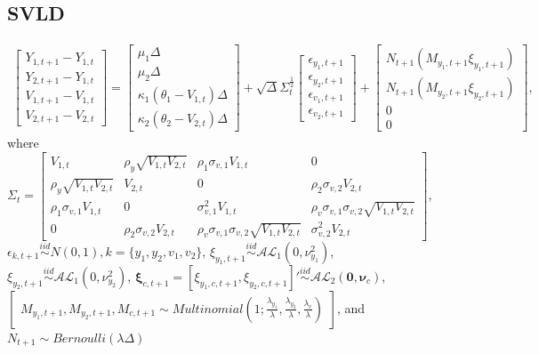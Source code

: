 \documentclass{article}\usepackage[]{graphicx}\usepackage[]{color}
\begin{document}
\subsection{SVLD}

\begin{align}
    \begin{bmatrix} Y_{1,t + 1} - Y_{1,t} \\ Y_{2,t + 1} - Y_{1,t} \\ V_{1,t + 1} - V_{1,t} \\ V_{2,t + 1} - V_{2,t} \end{bmatrix} = \begin{bmatrix} \mu_1 \Delta \\ \mu_2 \Delta \\ \kappa_1(\theta_1 - V_{1,t}) \Delta \\ \kappa_2(\theta_2 - V_{2,t}) \Delta \end{bmatrix} + \sqrt{\Delta}\Sigma_t^{\frac{1}{2}} \begin{bmatrix} \epsilon_{y_1,t+1} \\ \epsilon_{y_2,t+1} \\ \epsilon_{v_1,t+1} \\ \epsilon_{v_2,t+1} \end{bmatrix} + \begin{bmatrix} N_{t+1}(M_{y_1,t+1} \xi_{y_1, t+1} ) \\ N_{t+1}(M_{y_2,t+1} \xi_{y_2, t+1} ) \\ 0 \\ 0 \end{bmatrix}, \label{S_tdisc_2d}
\end{align}
where $\Sigma_{t} = \begin{bmatrix} V_{1,t} & \rho_y \sqrt{V_{1,t}V_{2,t}} & \rho_1 \sigma_{v,1} V_{1,t} & 0 \\ \rho_y \sqrt{V_{1,t}V_{2,t}} & V_{2,t} & 0 & \rho_2 \sigma_{v,2} V_{2,t} \\ \rho_1 \sigma_{v,1} V_{1,t} & 0 & \sigma_{v,1}^2 V_{1,t} & \rho_v \sigma_{v,1}\sigma_{v,2} \sqrt{V_{1,t} V_{2,t}} \\ 0 & \rho_2 \sigma_{v,2} V_{2,t} & \rho_v \sigma_{v,1}\sigma_{v,2} \sqrt{V_{1,t} V_{2,t}} & \sigma_{v,2}^2 V_{2,t} \end{bmatrix}$, \\$\epsilon_{k,t+1} \overset{iid}{\sim} N(0,1), k = \{y_1,y_2,v_1,v_2\}$, $\xi_{y_1,t+1} \overset{iid}{\sim} \mathcal{AL}_1(0, \nu_{y_1}^2)$, $\xi_{y_2,t+1} \overset{iid}{\sim} \mathcal{AL}_1(0, \nu_{y_2}^2)$, $\boldsymbol{\xi}_{c,t+1} = [\xi_{y_1,c,t+1}, \xi_{y_2,c,t+1}]' \overset{iid}{\sim} \mathcal{AL}_2(\boldsymbol{0}, \boldsymbol{\nu}_c)$, $\begin{bmatrix}
M_{y_1,t+1},M_{y_2,t+1},M_{c,t+1} \sim Multinomial(1;\frac{\lambda_{y_1}}{\lambda},\frac{\lambda_{y_2}}{\lambda},\frac{\lambda_c}{\lambda})
\end{bmatrix}$, and $N_{t+1} \sim Bernoulli(\lambda\Delta)$
\end{document}
